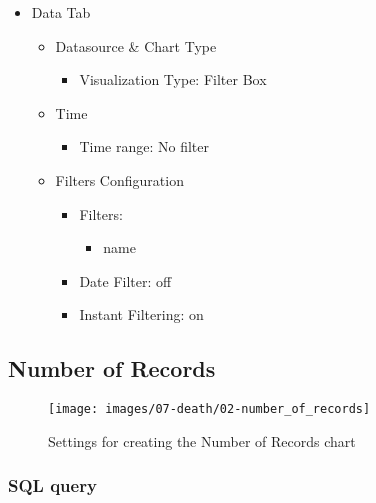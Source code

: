 \documentclass[
]{book}
\providecommand{\tightlist}{%
  \setlength{\itemsep}{0pt}\setlength{\parskip}{0pt}}
\begin{document}
\begin{itemize}
\tightlist
\item
  Data Tab

  \begin{itemize}
  \tightlist
  \item
    Datasource \& Chart Type

    \begin{itemize}
    \tightlist
    \item
      Visualization Type: Filter Box
    \end{itemize}
  \item
    Time

    \begin{itemize}
    \tightlist
    \item
      Time range: No filter
    \end{itemize}
  \item
    Filters Configuration

    \begin{itemize}
    \tightlist
    \item
      Filters:

      \begin{itemize}
      \tightlist
      \item
        name
      \end{itemize}
    \item
      Date Filter: off
    \item
      Instant Filtering: on
    \end{itemize}
  \end{itemize}
\end{itemize}

\hypertarget{number-of-records}{%
\subsection*{Number of Records}\label{number-of-records}}

\begin{figure}
\texttt{[image: images/07-death/02-number\_of\_records]} \caption{Settings for creating the Number of Records chart}\label{fig:numberOfRecords}
\end{figure}

\hypertarget{sql-query-27}{%
\subsubsection*{SQL query}\label{sql-query-27}}
\end{document}
